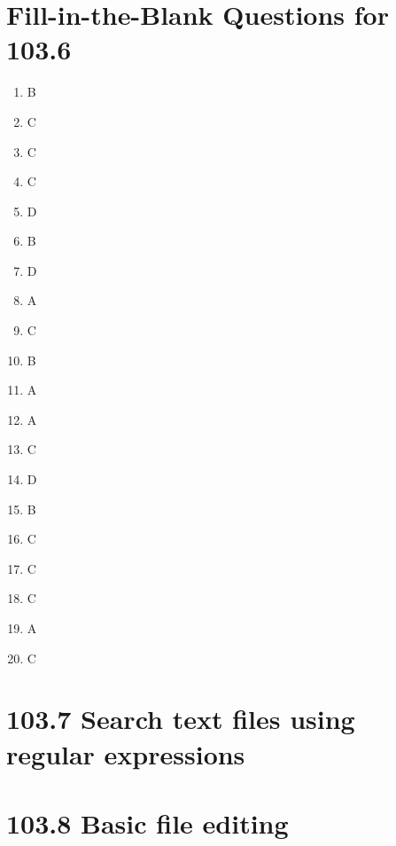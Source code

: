 \documentclass[a4paper]{report}
\begin{document}
\section*{Fill-in-the-Blank Questions for 103.6}

\begin{enumerate}[1.]
    \item B
    \item C
    \item C
    \item C
    \item D
    \item B
    \item D
    \item A
    \item C
    \item B
    \item A
    \item A
    \item C
    \item D
    \item B
    \item C
    \item C
    \item C
    \item A
    \item C
\end{enumerate}
\newpage
\section*{103.7 Search text files using regular expressions}



\newpage
\section*{103.8 Basic file editing}
\end{document}
